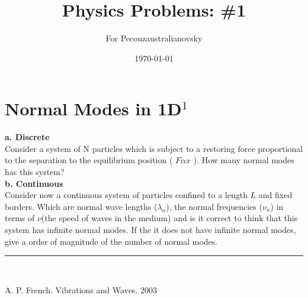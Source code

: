 \documentclass{article}
\begin{document}
\title{Physics Problems: \#1}

\author{For Pecouzaustralianovsky}

\date{\today}
\maketitle


\section*{Normal Modes in 1D$^1$}

\textbf{a. Discrete}\\

Consider a system of N particles which is subject to a restoring force proportional to the separation to the equilibrium position ( $ F \alpha x $ ). How many normal modes has this system?\\

\textbf{b. Continuous }\\

Consider now a continuous system of particles confined to a length $L$ and fixed borders. Which are normal wave lengths ($\lambda_n$), the normal frequencies  ($\nu_n$) in terms of $\nu$(the speed of waves in the medium) and is it correct to think that this system has infinite normal modes. If the it does not have infinite normal modes, give a order of magnitude of the number of normal modes.

\vspace{2mm}

\begin{center}
\noindent\rule{8cm}{0.4pt}\\
\end{center}

\noindent [1] A. P. French. Vibrations and Waves. 2003
\end{document}
